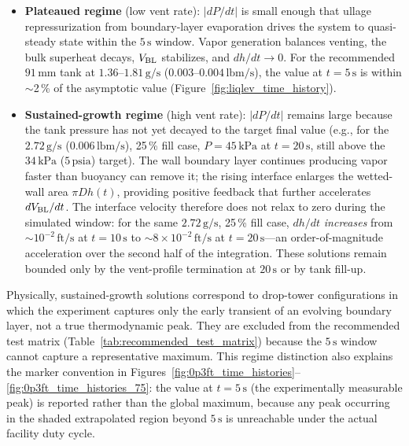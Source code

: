 \documentclass[conf]{new-aiaa}
\begin{document}
\begin{itemize}
    \item \textbf{Plateaued regime} (low vent rate): $|dP/dt|$ is small enough that ullage repressurization from boundary-layer evaporation drives the system to quasi-steady state within the $5\,\text{s}$ window. Vapor generation balances venting, the bulk superheat decays, $V_{\rm BL}$ stabilizes, and $dh/dt \to 0$. For the recommended $91\,\text{mm}$ tank at $1.36$--$1.81\,\text{g/s}$ ($0.003$--$0.004\,\text{lbm/s}$), the value at $t = 5\,\text{s}$ is within $\sim$2\,\% of the asymptotic value (Figure~\ref{fig:liqlev_time_history}).

    \item \textbf{Sustained-growth regime} (high vent rate): $|dP/dt|$ remains large because the tank pressure has not yet decayed to the target final value (e.g., for the $2.72\,\text{g/s}$ ($0.006\,\text{lbm/s}$), 25\,\% fill case, $P = 45\,\text{kPa}$ at $t = 20\,\text{s}$, still above the $34\,\text{kPa}$ ($5\,\text{psia}$) target). The wall boundary layer continues producing vapor faster than buoyancy can remove it; the rising interface enlarges the wetted-wall area $\pi D h(t)$, providing positive feedback that further accelerates $dV_{\rm BL}/dt$. The interface velocity therefore does not relax to zero during the simulated window: for the same $2.72\,\text{g/s}$, 25\,\% fill case, $dh/dt$ \textit{increases} from $\sim 10^{-2}\,\text{ft/s}$ at $t = 10\,\text{s}$ to $\sim 8 \times 10^{-2}\,\text{ft/s}$ at $t = 20\,\text{s}$---an order-of-magnitude acceleration over the second half of the integration. These solutions remain bounded only by the vent-profile termination at $20\,\text{s}$ or by tank fill-up.
\end{itemize}

Physically, sustained-growth solutions correspond to drop-tower configurations in which the experiment captures only the early transient of an evolving boundary layer, not a true thermodynamic peak. They are excluded from the recommended test matrix (Table~\ref{tab:recommended_test_matrix}) because the $5\,\text{s}$ window cannot capture a representative maximum. This regime distinction also explains the marker convention in Figures~\ref{fig:0p3ft_time_histories}--\ref{fig:0p3ft_time_histories_75}: the value at $t = 5\,\text{s}$ (the experimentally measurable peak) is reported rather than the global maximum, because any peak occurring in the shaded extrapolated region beyond $5\,\text{s}$ is unreachable under the actual facility duty cycle.
\end{document}
